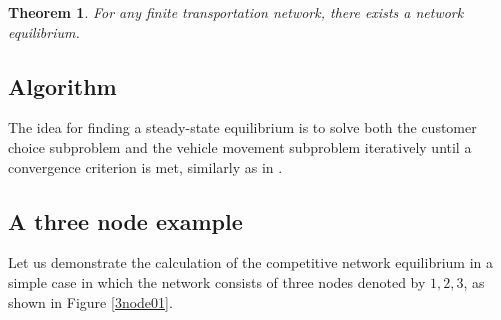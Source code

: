 \documentclass[dissertation,draft*]{aaltoseries}
\newtheorem{theorem}{Theorem}
\begin{document}
\begin{theorem}
For any finite transportation network, there exists a network equilibrium.
\end{theorem}


\subsection{Algorithm}
\label{ratkaisu01}
The idea for finding a steady-state equilibrium is to solve 
both the customer choice subproblem and the vehicle movement subproblem iteratively 
until a convergence criterion is met, similarly as in \citep{yang2010}. 
% 

\subsection{A three node example}
\label{compexample}
Let us demonstrate the calculation of the competitive network equilibrium in a simple case 
in which the network consists of three nodes denoted by $1,2,3$, as shown in Figure \ref{3node01}. 
\end{document}
